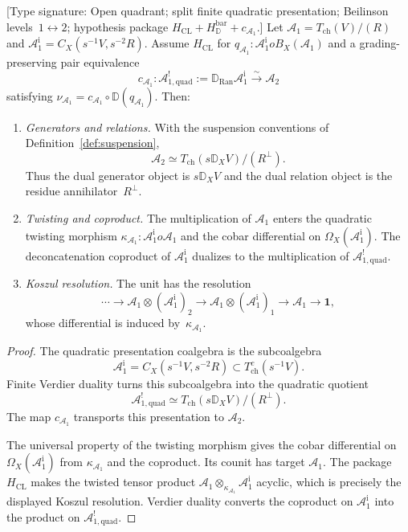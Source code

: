 \begin{theorem}\label{thm:structure-exchange}
\textup{[Type signature: Open quadrant; split finite quadratic
presentation; Beilinson levels~$1\leftrightarrow2$; hypothesis package
$H_{\mathrm{CL}}+H_{\mathbb D}^{\mathrm{bar}}+c_{\mathcal A_1}$.]}
Let
$\mathcal A_1=T_{\mathrm{ch}}(V)/(R)$ and
$\mathcal A_1^{\mathrm i}=C_X(s^{-1}V,s^{-2}R)$.  Assume
$H_{\mathrm{CL}}$ for
$q_{\mathcal A_1}\colon\mathcal A_1^{\mathrm i}	o
B_X(\mathcal A_1)$ and a grading-preserving pair equivalence
\[
 c_{\mathcal A_1}\colon
 \mathcal A^!_{1,\mathrm{quad}}
 :=\mathbb D_{\operatorname{Ran}}\mathcal A_1^{\mathrm i}
 \xrightarrow{\sim}\mathcal A_2
\]
satisfying
$\nu_{\mathcal A_1}=c_{\mathcal A_1}\circ
\mathbb D(q_{\mathcal A_1})$. Then:
\begin{enumerate}
\item \emph{Generators and relations.}
With the suspension conventions of
Definition~\ref{def:suspension},
\[
 \mathcal A_2\simeq
 T_{\mathrm{ch}}(s\mathbb D_XV)/(R^\perp).
\]
Thus the dual generator object is $s\mathbb D_XV$ and the dual
relation object is the residue annihilator~$R^\perp$.

\item \emph{Twisting and coproduct.}
The multiplication of $\mathcal A_1$ enters the quadratic twisting
morphism
$\kappa_{\mathcal A_1}\colon\mathcal A_1^{\mathrm i}	o
\mathcal A_1$ and the cobar differential on
$\Omega_X(\mathcal A_1^{\mathrm i})$.  The deconcatenation coproduct
of $\mathcal A_1^{\mathrm i}$ dualizes to the multiplication of
$\mathcal A^!_{1,\mathrm{quad}}$.

\item \emph{Koszul resolution.}
The unit has the resolution
\[
 \cdots\longrightarrow
 \mathcal A_1\otimes(\mathcal A_1^{\mathrm i})_2
 \longrightarrow
 \mathcal A_1\otimes(\mathcal A_1^{\mathrm i})_1
 \longrightarrow\mathcal A_1\longrightarrow\mathbf1,
\]
whose differential is induced by~$\kappa_{\mathcal A_1}$.
\end{enumerate}
\end{theorem}

\begin{proof}
The quadratic presentation coalgebra is the subcoalgebra
\[
 \mathcal A_1^{\mathrm i}
 =C_X(s^{-1}V,s^{-2}R)
 \subset T^c_{\mathrm{ch}}(s^{-1}V).
\]
Finite Verdier duality turns this subcoalgebra into the quadratic
quotient
\[
 \mathcal A^!_{1,\mathrm{quad}}
 \simeq T_{\mathrm{ch}}(s\mathbb D_XV)/(R^\perp).
\]
The map $c_{\mathcal A_1}$ transports this presentation to
$\mathcal A_2$.

The universal property of the twisting morphism gives the cobar
differential on $\Omega_X(\mathcal A_1^{\mathrm i})$ from
$\kappa_{\mathcal A_1}$ and the coproduct.  Its counit has target
$\mathcal A_1$.  The package $H_{\mathrm{CL}}$ makes the twisted
tensor product
$\mathcal A_1\otimes_{\kappa_{\mathcal A_1}}
\mathcal A_1^{\mathrm i}$ acyclic, which is precisely the displayed
Koszul resolution.  Verdier duality converts the coproduct on
$\mathcal A_1^{\mathrm i}$ into the product on
$\mathcal A^!_{1,\mathrm{quad}}$.
\end{proof}

